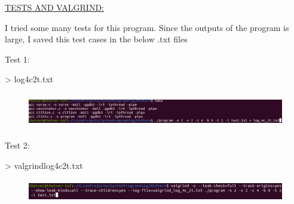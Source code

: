 \documentclass[12pt]{report}
\renewcommand{\_}{\kern-1.5pt\textunderscore\kern-1.5pt}
\begin{document}
\vspace{\baselineskip}

\vspace{\baselineskip}

\vspace{\baselineskip}

\vspace{\baselineskip}

\vspace{\baselineskip}

\vspace{\baselineskip}
\newpage
\begin{justify}
{\fontsize{16pt}{19.2pt}\selectfont \uline{TESTS AND VALGRIND:}}
\end{justify}
\begin{justify}
I tried some many tests for this program. Since the outputs of the program is large, I saved this test cases in the below .txt files
\end{justify}
\begin{justify}
Test 1: 
\end{justify}
\begin{justify}
> log\_4c\_2t.txt
\end{justify}


\begin{figure}[H]
	\begin{Center}
		\includegraphics[width=6.54in,height=0.61in]{image1.png}
	\end{Center}
\end{figure}




\vspace{\baselineskip}\begin{justify}
Test 2:
\end{justify}
\begin{justify}
> valgrind\_log\_4c\_2t.txt
\end{justify}


\begin{figure}[H]
	\begin{Center}
		\includegraphics[width=6.57in,height=0.4in]{image2.png}
	\end{Center}
\end{figure}
\end{document}
